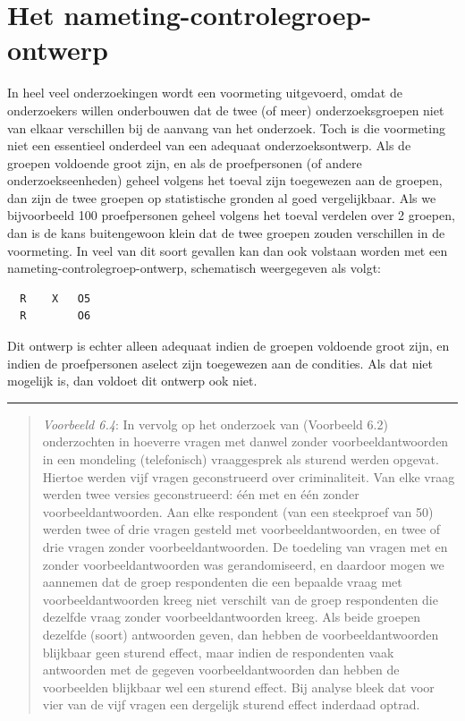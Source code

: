 \documentclass[
]{book}
\begin{document}
\section{Het nameting-controlegroep-ontwerp}\label{sec:nameting-controlegroep}

In heel veel onderzoekingen wordt een voormeting uitgevoerd, omdat de
onderzoekers willen onderbouwen dat de twee (of meer) onderzoeksgroepen
niet van elkaar verschillen bij de aanvang van het onderzoek. Toch is
die voormeting niet een essentieel onderdeel van een adequaat
onderzoeksontwerp. Als de groepen voldoende groot zijn, en als de
proefpersonen (of andere onderzoekseenheden) geheel volgens het toeval
zijn toegewezen aan de groepen, dan zijn de twee groepen op statistische
gronden al goed vergelijkbaar. Als we bijvoorbeeld 100 proefpersonen
geheel volgens het toeval verdelen over 2 groepen, dan is de kans
buitengewoon klein dat de twee groepen zouden verschillen in de
voormeting. In veel van dit soort gevallen kan dan ook volstaan worden
met een nameting-controlegroep-ontwerp, schematisch weergegeven als
volgt:

\begin{verbatim}
  R    X   O5
  R        O6
\end{verbatim}

Dit ontwerp is echter alleen adequaat indien de groepen voldoende groot
zijn, en indien de proefpersonen aselect zijn toegewezen aan de
condities. Als dat niet mogelijk is, dan voldoet dit ontwerp ook niet.

\begin{center}\rule{0.5\linewidth}{0.5pt}\end{center}

\begin{quote}
\emph{Voorbeeld 6.4}: In vervolg op het onderzoek van \citep{Houtk91}
(Voorbeeld 6.2)
onderzochten \citep{Wijff92} in hoeverre vragen met
danwel zonder voorbeeldantwoorden in een mondeling (telefonisch)
vraaggesprek als sturend werden opgevat. Hiertoe werden vijf vragen
geconstrueerd over criminaliteit. Van elke vraag werden twee versies
geconstrueerd: één met en één zonder voorbeeldantwoorden. Aan elke
respondent (van een steekproef van 50) werden twee of drie vragen
gesteld met voorbeeldantwoorden, en twee of drie vragen zonder
voorbeeldantwoorden. De toedeling van vragen met en zonder
voorbeeldantwoorden was gerandomiseerd, en daardoor mogen we aannemen
dat de groep respondenten die een bepaalde vraag met voorbeeldantwoorden
kreeg niet verschilt van de groep respondenten die dezelfde vraag zonder
voorbeeldantwoorden kreeg. Als beide groepen dezelfde (soort) antwoorden
geven, dan hebben de voorbeeldantwoorden blijkbaar geen sturend effect,
maar indien de respondenten vaak antwoorden met de gegeven
voorbeeldantwoorden dan hebben de voorbeelden blijkbaar wel een sturend
effect. Bij analyse bleek dat voor vier van de vijf vragen een dergelijk
sturend effect inderdaad optrad.
\end{quote}
\end{document}
